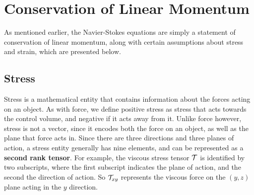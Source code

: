 \section{Conservation of Linear Momentum} 

As mentioned earlier, the Navier-Stokes equations are simply a statement of conservation of linear momentum, along with certain assumptions about stress  and strain, which are presented below. 
\subsection{Stress}

Stress is a mathematical entity that contains information about the forces acting on an object. As with force, we define positive stress as stress that acts towards the control volume, and negative if it acts away from it. Unlike force however, stress is not a vector, since it encodes both the force on an object, as well as the plane that force acts in. Since there are three directions and three planes of action, a stress entity generally has nine elements, and can be represented as a {\bf second rank tensor}. For example, the viscous stress tensor $\mathcal{T}$ is identified by two subscripts, where the first subscript indicates the plane of action, and the second the direction of action. So $\mathcal{T}_{xy}$ represents the viscous force on the $(y,z)$ plane acting in the $y$ direction. 

